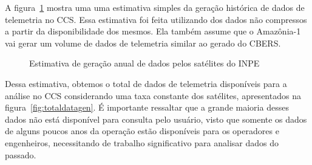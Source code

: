 {\color{cerulean}

A figura~\ref{fig:datagenest} mostra uma uma estimativa simples da geração histórica de dados de telemetria no CCS.
Essa estimativa foi feita utilizando dos dados não compressos a partir da disponibilidade dos mesmos.
Ela também assume que o Amazônia-1 vai gerar um volume de dados de telemetria similar ao gerado do CBERS.

\begin{figure}[!htb]
	\caption{Estimativa de geração anual de dados pelos satélites do INPE}\label{fig:datagenest}
	\vspace{4mm}
	\begin{center}
	\end{center}
	\vspace{2mm}
\end{figure}

Dessa estimativa, obtemos o total de dados de telemetria disponíveis para a análise no CCS considerando uma taxa constante dos satélites, apresentados na figura~\ref{fig:totaldatagen}.
É importante ressaltar que a grande maioria desses dados não está disponível para consulta pelo usuário, visto que somente os dados de alguns poucos anos da operação estão disponíveis para os operadores e engenheiros, necessitando de trabalho significativo para analisar dados do passado.

}
